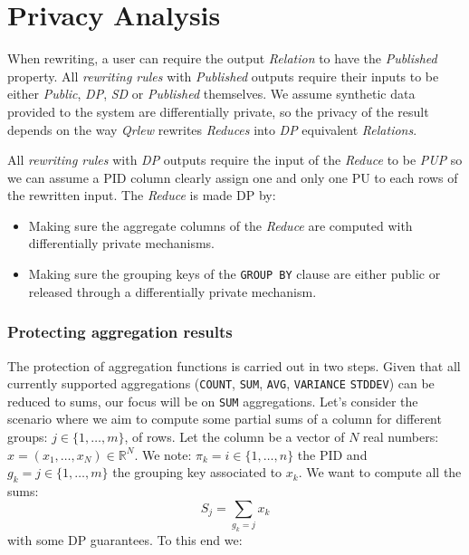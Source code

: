 \documentclass[letterpaper]{article} %
\newcommand{\qrlew}{\emph{Qrlew}}
\begin{document}
\section{Privacy Analysis}
\label{sec:privacy_analysis}

When rewriting, a user can require the output \emph{Relation} to have the \emph{Published} property. All \emph{rewriting rules} with \emph{Published} outputs require their inputs to be either \emph{Public}, \emph{DP}, \emph{SD} or \emph{Published} themselves. We assume synthetic data provided to the system are differentially private, so the privacy of the result depends on the way \qrlew{} rewrites \emph{Reduces} into \emph{DP} equivalent \emph{Relations}.

All \emph{rewriting rules} with \emph{DP} outputs require the input of the \emph{Reduce} to be \emph{PUP} so we can assume a PID column clearly assign one and only one PU to each rows of the rewritten input. The \emph{Reduce} is made DP by:
\begin{itemize}
    \item Making sure the aggregate columns of the \emph{Reduce} are computed with differentially private mechanisms.
    \item Making sure the grouping keys of the \texttt{GROUP BY} clause are either public or released through a differentially private mechanism.
\end{itemize}

\subsubsection{Protecting aggregation results}

The protection of aggregation functions is carried out in two steps. Given that all currently supported aggregations (\texttt{COUNT}, \texttt{SUM}, \texttt{AVG}, \texttt{VARIANCE} \texttt{STDDEV}) can be reduced to sums, our focus will be on \texttt{SUM} aggregations. Let's consider the scenario where we aim to compute some partial sums of a column for different groups: $j\in\{1,\ldots,m\}$, of rows.
Let the column be a vector of $N$ real numbers: $x = \left(x_1,\ldots, x_N\right)\in\mathbb{R}^N$. We note: $\pi_k = i \in \{1,\ldots,n\}$ the PID and $g_k = j \in \{1,\ldots,m\}$ the grouping key associated to $x_k$.
We want to compute all the sums:
$$S_j = \sum_{g_k = j} x_k$$
with some DP guarantees. To this end we:
\end{document}
